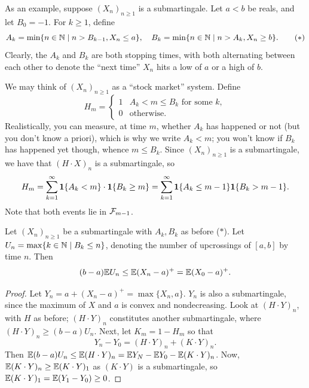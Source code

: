 As an example, suppose $(X_n)_{n \geq 1}$ is a submartingale. Let $a < b$ be reals, and let $B_0 = -1$. For $k \geq 1$, define
\[ A_k = \min\{n \in \mathbb N \mid n > B_{k-1}, X_n \leq a\}, \quad B_k = \min\{n \in \mathbb N \mid n > A_k, X_n \geq b\}. \tag{$\ast$} \]
Clearly, the $A_k$ and $B_k$ are both stopping times, with both alternating between each other to denote the ``next time'' $X_n$ hits a low of $a$ or a high of $b$. 
\begin{example}
    We may think of $(X_n)_{n \geq 1}$ as a ``stock market'' system. Define
    \[ H_m = \begin{cases} 1 & A_k < m \leq B_k \text{ for some $k$}, \\ 0 & \text{otherwise.} \end{cases} \]
    {\color{amethyst} Realistically, you can measure, at time $m$, whether $A_k$ has happened or not (but you don't know a priori), which is why we write $A_k < m$; you won't know if $B_k$ has happened yet though, whence $m \leq B_k$.} Since $(X_n)_{n \geq 1}$ is a submartingale, we have that $(H \cdot X)_n$ is a submartingale, so
    \[ H_m = \sum_{k=1}^\infty \mathbf 1 \{A_k < m\} \cdot \mathbf 1 \{B_k \geq m\} = \sum_{k=1}^\infty \mathbf 1 \{A_k \leq m - 1\} \mathbf 1 \{B_k > m - 1\}. \]
    Note that both events lie in $\mathcal F_{m-1}$.
\end{example}

\begin{theorem} \label{thm:doob_upcrossing_inequality}
    Let $(X_n)_{n \geq 1}$ be a submartingale with $A_k, B_k$ as before ($\ast$). Let $U_n = \max\{k \in \mathbb N \mid B_k \leq n\}$, denoting the number of upcrossings of $[a,b]$ by time $n$. Then
    \[ (b - a) \mathbb E U_n \leq \mathbb E (X_n - a)^+ = \mathbb E(X_0 - a)^+. \]
\end{theorem} \vspace{-8pt}
\begin{proof}
    Let $Y_n = a + (X_n - a)^+ = \max\{X_n, a\}$. $Y_n$ is also a submartingale, since the maximum of $X$ and $a$ is convex and nondecreasing. Look at $(H \cdot Y)_n$, with $H$ as before; $(H \cdot Y)_n$ constitutes another submartingale, where $(H \cdot Y)_n \geq (b - a) U_n$. Next, let $K_m = 1 - H_m$ so that
    \[ Y_n - Y_0 = (H \cdot Y)_n + (K \cdot Y)_n. \]
    Then $\mathbb E(b - a) U_n \leq \mathbb E (H \cdot Y)_n = \mathbb E Y_N - \mathbb E Y_0 - \mathbb E(K \cdot Y)_n$. Now, $\mathbb E(K \cdot Y)_n \geq \mathbb E(K \cdot Y)_1$ as $(K \cdot Y)$ is a submartingale, so $\mathbb E(K \cdot Y)_1 = \mathbb E(Y_1 - Y_0) \geq 0$.
\end{proof}

